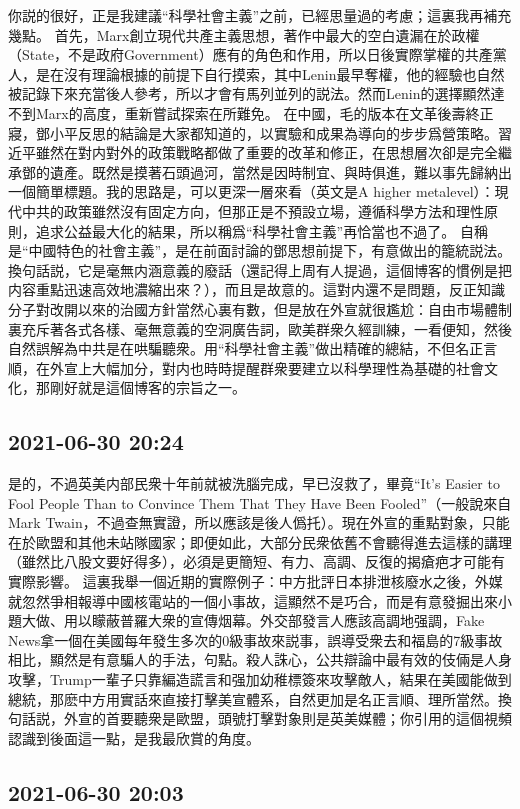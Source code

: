 \documentclass[twocolumn]{ctexart}
\begin{document}
你説的很好，正是我建議“科學社會主義”之前，已經思量過的考慮；這裏我再補充幾點。
首先，Marx創立現代共產主義思想，著作中最大的空白遺漏在於政權（State，不是政府Government）應有的角色和作用，所以日後實際掌權的共產黨人，是在沒有理論根據的前提下自行摸索，其中Lenin最早奪權，他的經驗也自然被記錄下來充當後人參考，所以才會有馬列並列的説法。然而Lenin的選擇顯然達不到Marx的高度，重新嘗試探索在所難免。
在中國，毛的版本在文革後壽終正寢，鄧小平反思的結論是大家都知道的，以實驗和成果為導向的步步爲營策略。習近平雖然在對内對外的政策戰略都做了重要的改革和修正，在思想層次卻是完全繼承鄧的遺產。既然是摸著石頭過河，當然是因時制宜、與時俱進，難以事先歸納出一個簡單標題。我的思路是，可以更深一層來看（英文是A higher metalevel）：現代中共的政策雖然沒有固定方向，但那正是不預設立場，遵循科學方法和理性原則，追求公益最大化的結果，所以稱爲“科學社會主義”再恰當也不過了。
自稱是“中國特色的社會主義”，是在前面討論的鄧思想前提下，有意做出的籠統説法。換句話説，它是毫無内涵意義的廢話（還記得上周有人提過，這個博客的慣例是把内容重點迅速高效地濃縮出來？），而且是故意的。這對内還不是問題，反正知識分子對改開以來的治國方針當然心裏有數，但是放在外宣就很尷尬：自由市場體制裏充斥著各式各樣、毫無意義的空洞廣告詞，歐美群衆久經訓練，一看便知，然後自然誤解為中共是在哄騙聽衆。用“科學社會主義”做出精確的總結，不但名正言順，在外宣上大幅加分，對内也時時提醒群衆要建立以科學理性為基礎的社會文化，那剛好就是這個博客的宗旨之一。
\subsection*{2021-06-30 20:24}

是的，不過英美内部民衆十年前就被洗腦完成，早已沒救了，畢竟“It’s Easier to Fool People Than to Convince Them That They Have Been Fooled”（一般說來自Mark Twain，不過查無實證，所以應該是後人僞托）。現在外宣的重點對象，只能在於歐盟和其他未站隊國家；即便如此，大部分民衆依舊不會聽得進去這樣的講理（雖然比八股文要好得多），必須是更簡短、有力、高調、反復的揭瘡疤才可能有實際影響。
這裏我舉一個近期的實際例子：中方批評日本排泄核廢水之後，外媒就忽然爭相報導中國核電站的一個小事故，這顯然不是巧合，而是有意發掘出來小題大做、用以矇蔽普羅大衆的宣傳烟幕。外交部發言人應該高調地强調，Fake News拿一個在美國每年發生多次的0級事故來説事，誤導受衆去和福島的7級事故相比，顯然是有意騙人的手法，句點。殺人誅心，公共辯論中最有效的伎倆是人身攻擊，Trump一輩子只靠編造謊言和强加幼稚標簽來攻擊敵人，結果在美國能做到總統，那麽中方用實話來直接打擊美宣體系，自然更加是名正言順、理所當然。換句話説，外宣的首要聽衆是歐盟，頭號打擊對象則是英美媒體；你引用的這個視頻認識到後面這一點，是我最欣賞的角度。
\subsection*{2021-06-30 20:03}
\end{document}
